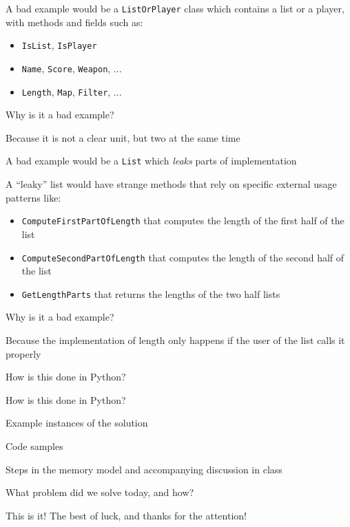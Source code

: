 \documentclass{beamer}
\begin{document}
\begin{slide}{
\item A bad example would be a \texttt{ListOrPlayer} class which contains a list or a player, with methods and fields such as:
\begin{itemize}
\item \texttt{IsList}, \texttt{IsPlayer}
\item \texttt{Name}, \texttt{Score}, \texttt{Weapon}, ...
\item \texttt{Length}, \texttt{Map}, \texttt{Filter}, ...
\end{itemize}
\item Why is it a bad example?
\pause
\item Because it is not a clear unit, but two at the same time
}\end{slide}

\begin{slide}{
\item A bad example would be a \texttt{List} which \textit{leaks} parts of implementation
\item A ``leaky'' list would have strange methods that rely on specific external usage patterns like:
\begin{itemize}
\item \texttt{ComputeFirstPartOfLength} that computes the length of the first half of the list
\item \texttt{ComputeSecondPartOfLength} that computes the length of the second half of the list
\item \texttt{GetLengthParts} that returns the lengths of the two half lists
\end{itemize}
\item Why is it a bad example?
\pause
\item Because the implementation of length only happens if the user of the list calls it properly
}\end{slide}

\begin{slide}{
\item How is this done in Python?
}\end{slide}

\begin{slide}{
\item How is this done in Python?
}\end{slide}

\begin{slide}{
\item Example instances of the solution
\item Code samples
\item Steps in the memory model and accompanying discussion in class
}\end{slide}

\begin{slide}{
\item What problem did we solve today, and how?
}\end{slide}

\begin{frame}{This is it!}
\center
\fontsize{18pt}{7.2}\selectfont
The best of luck, and thanks for the attention!
\end{frame}
\end{document}
